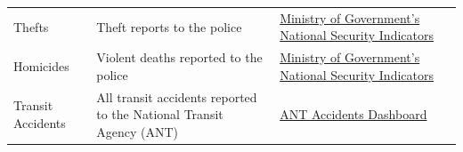\documentclass[11pt,a4paper]{article}\usepackage[]{graphicx}\usepackage[]{xcolor}
\begin{document}
\begin{table}[h]
\begin{tabular}{lp{5cm}p{5cm}l@{}}
Thefts                      & Theft reports to the police                                                                                 & \href{http://cifras.ministeriodegobierno.gob.ec/comisioncifras/}{Ministry of Government's National Security Indicators} \\
Homicides                   & Violent deaths reported to the police                                                                       & \href{http://cifras.ministeriodegobierno.gob.ec/comisioncifras/}{Ministry of Government's National Security Indicators} \\
Transit Accidents           & All transit accidents reported to the National Transit Agency (ANT)                                         & \href{https://www.ant.gob.ec/visor-de-siniestralidad-estadisticas/}{ANT Accidents Dashboard}                               \\ 
\bottomrule
\end{tabular}
\end{table}
\end{document}
